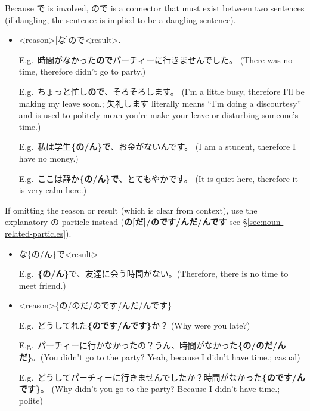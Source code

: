\documentclass[../nihongo-gakushuu-kyouzai.tex]{subfiles}
\begin{document}
\begin{itemize}
    Because で is involved, ので is a connector that must exist between two sentences (if dangling, the sentence is implied to be a dangling sentence).
    \begin{itemize}
        \item <reason>[な]ので<result>.


        E.g.\ 時間がなかった\textbf{ので}パーチィーに行きませんでした。 (There was no time, therefore didn't go to party.)

        E.g.\ ちょっと忙し\textbf{ので}、そろそろします。 (I'm a little busy, therefore I'll be making my leave soon.; 失礼します literally means ``I'm doing a discourtesy'' and is used to politely mean you're make your leave or disturbing someone's time.)

        E.g.\ 私は学生\textbf{\{の/ん\}で}、お金がないんです。 (I am a student, therefore I have no money.)

        E.g.\ ここは静か\textbf{\{の/ん\}で}、とてもやかです。 (It is quiet here, therefore it is very calm here.)
    \end{itemize}

    If omitting the reason or result (which is clear from context), use the explanatory-の particle instead (\textbf{の[だ]/のです/んだ/んです} see \S\ref{sec:noun-related-particles}).

    \begin{itemize}
        \item な\{の/ん\}で<result>


        E.g.\ \textbf{\{の/ん\}}で、友達に会う時間がない。(Therefore, there is no time to meet friend.)

        \item <reason>\{の/のだ/のです/んだ/んです\}

        E.g.\ どうしてれた\textbf{\{のです/んです\}}か？ (Why were you late?)

        E.g.\ パーチィーに行かなかったの？うん、時間がなかった\textbf{\{の/のだ/んだ\}}。(You didn't go to the party? Yeah, because I didn't have time.; casual)

        E.g.\ どうしてパーチィーに行きませんでしたか？時間がなかった\textbf{\{のです/んです\}}。 (Why didn't you go to the party? Because I didn't have time.; polite)
    \end{itemize}

\end{itemize}
\end{document}
